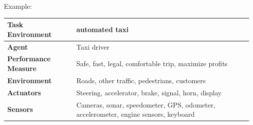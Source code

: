 Example:
\begin{customTableWrapper}{1.2}
\begin{table}[H]
    \centering
    \begin{tabular}{|l p{10cm}|}
        \hline
        \textbf{Task Environment} & automated taxi \\
        \hline\hline
        
        \textbf{Agent} & Taxi driver \\
        \hline

        \textbf{Performance Measure} & Safe, fast, legal, comfortable trip, maximize profits \\

        \textbf{Environment} & Roads, other traffic, pedestrians, customers \\

        \textbf{Actuators} & Steering, accelerator, brake, signal, horn, display \\

        \textbf{Sensors} & Cameras, sonar, speedometer, GPS, odometer, accelerometer, engine sensors, keyboard \\
        \hline
    \end{tabular}
\end{table}
\end{customTableWrapper}






